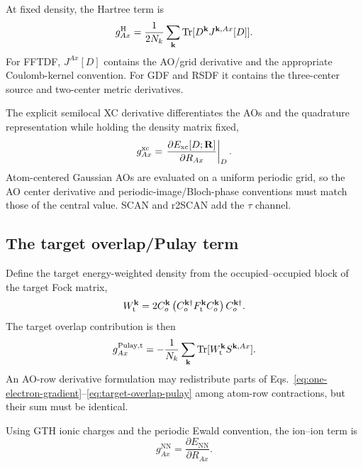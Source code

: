 At fixed density, the Hartree term is
\begin{equation}
  g_{Ax}^{\mathrm H}
  =\frac{1}{2N_k}\sum_{\mathbf{k}}
    \operatorname{Tr}[D^{\mathbf{k}}J^{\mathbf{k},Ax}[D]].
  \label{eq:hartree-gradient}
\end{equation}
For FFTDF, $J^{Ax}[D]$ contains the AO/grid derivative and the appropriate
Coulomb-kernel convention.  For GDF and RSDF it contains the three-center
source and two-center metric derivatives.

The explicit semilocal XC derivative differentiates the AOs and the
quadrature representation while holding the density matrix fixed,
\begin{equation}
  g_{Ax}^{\mathrm{xc}}
  =\left.
    \frac{\partial E_{\mathrm{xc}}[D;\mathbf{R}]}{\partial R_{Ax}}
   \right|_D.
  \label{eq:xc-explicit-gradient}
\end{equation}
Atom-centered Gaussian AOs are evaluated on a uniform periodic grid, so the AO
center derivative and periodic-image/Bloch-phase conventions must match those
of the central value.  SCAN and r2SCAN add the $\tau$ channel.

\subsection{The target overlap/Pulay term}

Define the target energy-weighted density from the occupied--occupied block of
the target Fock matrix,
\begin{equation}
  W_{\mathrm t}^{\mathbf{k}}
  =2C_o^{\mathbf{k}}
    \left(C_o^{\mathbf{k}\dagger}F_{\mathrm t}^{\mathbf{k}}C_o^{\mathbf{k}}\right)
    C_o^{\mathbf{k}\dagger}.
  \label{eq:target-energy-weighted-density}
\end{equation}
The target overlap contribution is then
\begin{equation}
  g_{Ax}^{\mathrm{Pulay,t}}
  =-\frac{1}{N_k}\sum_{\mathbf{k}}
    \operatorname{Tr}[W_{\mathrm t}^{\mathbf{k}}S^{\mathbf{k},Ax}].
  \label{eq:target-overlap-pulay}
\end{equation}
An AO-row derivative formulation may redistribute parts of
Eqs.~\eqref{eq:one-electron-gradient}--\eqref{eq:target-overlap-pulay} among
atom-row contractions, but their sum must be identical.

Using GTH ionic charges and the periodic Ewald convention, the ion--ion term is
\begin{equation}
  g_{Ax}^{\mathrm{NN}}
  =\frac{\partial E_{\mathrm{NN}}}{\partial R_{Ax}}.
  \label{eq:nuclear-repulsion-gradient}
\end{equation}

